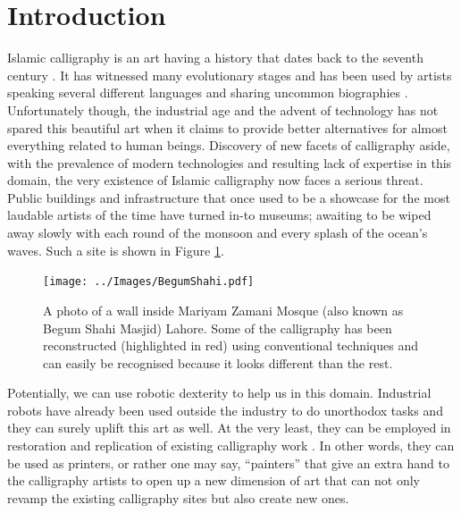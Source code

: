 \section{Introduction}
\label{Chapter:Introduction}
{
    Islamic calligraphy is an art having a history that dates back to the seventh century \cite{bib01, bib02}. It has witnessed many evolutionary stages \cite{bib02, bib03} and has been used by artists speaking several different languages \cite{bib04} and sharing uncommon biographies \cite{bib05,bib06,bib07,bib08}. Unfortunately though, the industrial age and the advent of technology has not spared this beautiful art when it claims to provide better alternatives for almost everything related to human beings. Discovery of new facets of calligraphy aside, with the prevalence of modern technologies and resulting lack of expertise in this domain, the very existence of Islamic calligraphy now faces a serious threat. Public buildings and infrastructure that once used to be a showcase for the most laudable artists of the time have turned in-to museums; awaiting to be wiped away slowly with each round of the monsoon and every splash of the ocean’s waves. Such a site is shown in Figure \ref{Fig:BegumShahi}.

    \begin{figure}[!t]
        \centering
        \texttt{[image: ../Images/BegumShahi.pdf]}
        \caption{A photo of a wall inside Mariyam Zamani Mosque (also known as Begum Shahi Masjid) Lahore. Some of the calligraphy has been reconstructed (highlighted in red) using conventional techniques and can easily be recognised because it looks different than the rest.}
        \label{Fig:BegumShahi}
    \end{figure}
%
%


    Potentially, we can use robotic dexterity to help us in this domain. Industrial robots have already been used outside the industry to do unorthodox tasks \cite{bib09, bib10,bib11,bib12} and they can surely uplift this art as well. At the very least, they can be employed in restoration and replication of existing calligraphy work \cite{bib13}. In other words, they can be used as printers, or rather one may say, ``painters'' that give an extra hand to the calligraphy artists to open up a new dimension of art that can not only revamp the existing calligraphy sites but also create new ones.

}
